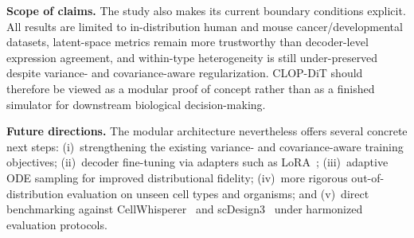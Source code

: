 \documentclass[genes,article,submit,pdftex,oneauthor]{Definitions/mdpi}
\begin{document}
\textbf{Scope of claims.} The study also makes its current boundary conditions explicit. All results are limited to in-distribution human and mouse cancer/developmental datasets, latent-space metrics remain more trustworthy than decoder-level expression agreement, and within-type heterogeneity is still under-preserved despite variance- and covariance-aware regularization. CLOP-DiT should therefore be viewed as a modular proof of concept rather than as a finished simulator for downstream biological decision-making.

\textbf{Future directions.} The modular architecture nevertheless offers several concrete next steps: (i)~strengthening the existing variance- and covariance-aware training objectives; (ii)~decoder fine-tuning via adapters such as LoRA~\cite{ref-scgpt}; (iii)~adaptive ODE sampling for improved distributional fidelity; (iv)~more rigorous out-of-distribution evaluation on unseen cell types and organisms; and (v)~direct benchmarking against CellWhisperer~\cite{ref-cellwhisperer} and scDesign3~\cite{ref-scdesign3} under harmonized evaluation protocols.





\end{document}
